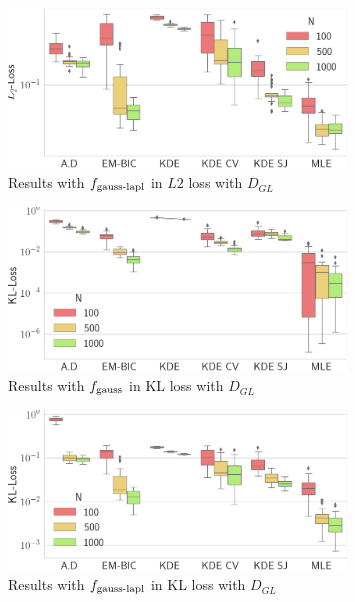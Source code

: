 \begin{figure}
\center
    \includegraphics[width=0.8\textwidth]{./TeX_files/res_lapl_gauss_L2_GL.png}
    \caption{Results with $f_{\textnormal{gauss-lapl}}$ in $L2$ loss with $D_{GL}$}
    \label{fig:res_lapl_gauss_L2_GL}
\end{figure}
\begin{figure}
\center
    \includegraphics[width=0.8\textwidth]{./TeX_files/res_gauss_KL_GL.png}
    \caption{Results with $f_{\textnormal{gauss}}$ in KL loss with $D_{GL}$}
    \label{fig:res_gauss_KL_GL}
\end{figure}   
\begin{figure}
\center
    \includegraphics[width=0.8\textwidth]{./TeX_files/res_lapl_gauss_KL_GL.png}
    \caption{Results with $f_{\textnormal{gauss-lapl}}$ in KL loss with $D_{GL}$}
    \label{fig:res_lapl_gauss_KL_GL}
\end{figure}
